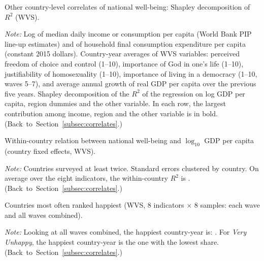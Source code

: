 \documentclass[12pt]{article}
\begin{document}
\begin{table}[htbp]
    \centering
    \caption{Other country-level correlates of national well-being: Shapley decomposition of $R^2$ (WVS).}\label{tab:correlates}
    \begin{adjustbox}{max width=\textwidth}
    
    \end{adjustbox}
    \begin{minipage}{\textwidth}\footnotesize \textit{Note:} Log of median daily income or consumption per capita (World Bank PIP line-up estimates) and of household final consumption expenditure per capita (constant 2015 dollars). Country-year averages of WVS variables: perceived freedom of choice and control (1--10), importance of God in one's life (1--10), justifiability of homosexuality (1--10), importance of living in a democracy (1--10, waves 5--7), and average annual growth of real GDP per capita over the previous five years. Shapley decomposition of the $R^2$ of the regression on log GDP per capita, region dummies and the other variable. In each row, the largest contribution among income, region and the other variable is in bold. \hfill(Back~to~Section~\ref{subsec:correlates}.)\end{minipage}
\end{table}

\begin{table}[htbp]
    \centering
    \caption{Within-country relation between national well-being and $\log_{10}$ GDP per capita (country fixed effects, WVS).}\label{tab:within}
    \begin{adjustbox}{max width=\textwidth}
    
    \end{adjustbox}
    \begin{minipage}{\textwidth}\footnotesize \textit{Note:} Countries surveyed at least twice. Standard errors clustered by country. On average over the eight indicators, the within-country $R^2$ is \meanWithinRtwo. \hfill(Back~to~Section~\ref{subsec:correlates}.)\end{minipage}
\end{table}

\begin{table}[htbp]
    \centering
    \caption{Countries most often ranked happiest (WVS, 8 indicators $\times$ 8 samples: each wave and all waves combined).}\label{tab:happiest}
    
    \begin{minipage}{\textwidth}\footnotesize \textit{Note:} Looking at all waves combined, the happiest country-year is: \happiestAllWaves. For \textit{Very Unhappy}, the happiest country-year is the one with the lowest share. \hfill(Back~to~Section~\ref{subsec:correlates}.)\end{minipage}
\end{table}
\end{document}
